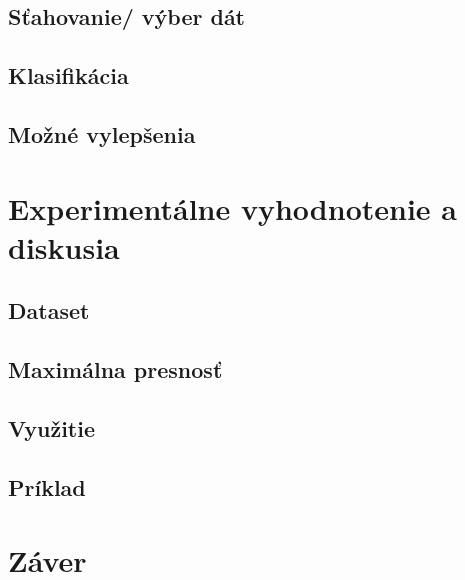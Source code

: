 \section{Sťahovanie/ výber dát}


\section{Klasifikácia}


\section{Možné vylepšenia}


\chapter{Experimentálne vyhodnotenie a diskusia}
\label{experimenty}


\section{Dataset}


\section{Maximálna presnosť}


\section{Využitie}


\section{Príklad}


\chapter{Záver}
\label{zaver}





